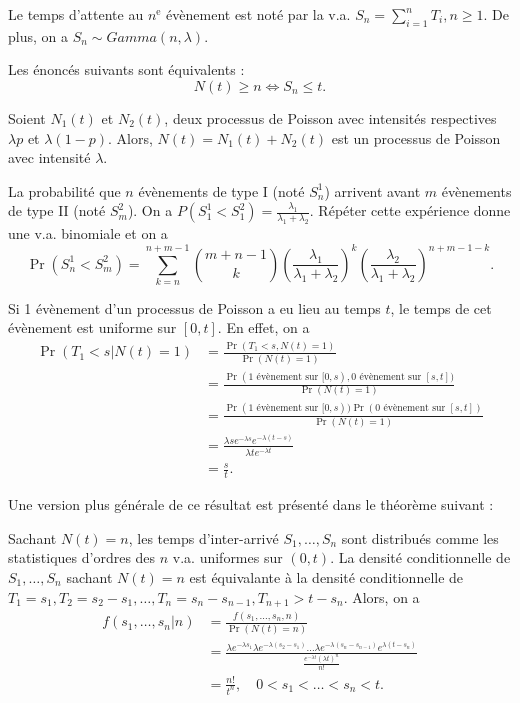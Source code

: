 \begin{definition}{}{}
	Le temps d'attente au $n^\text{e}$ évènement est noté par la v.a. $S_n = \sum_{i = 1}^{n}T_i, n\geq 1$. De plus, on a $S_n \sim Gamma(n, \lambda)$.
\end{definition}

Les énoncés suivants sont équivalents : 
$$N(t) \geq n \Leftrightarrow S_n \leq t.$$

\begin{propriete}{}{}
	Soient $N_1(t)$ et $N_2(t)$, deux processus de Poisson avec intensités respectives $\lambda p$ et $\lambda(1-p)$. Alors, $N(t) = N_1(t) + N_2(t)$ est un processus de Poisson avec intensité $\lambda$. 
\end{propriete}

La probabilité que $n$ évènements de type I (noté $S_n^1$) arrivent avant $m$ évènements de type II (noté $S_m^2$). On a $P(S_1^1 < S_1^2) = \frac{\lambda_1}{\lambda_1 + \lambda_2}$. Répéter cette expérience donne une v.a. binomiale et on a 
$$\Pr\left(S_n^1<S_m^2\right) = \sum_{k = n}^{n + m - 1} \binom{m + n - 1}{k} \left(\frac{\lambda_1}{\lambda_1 + \lambda_2}\right)^k \left(\frac{\lambda_2}{\lambda_1 + \lambda_2}\right)^{n+m-1-k}.$$

\begin{proposition}{}{}
	Si 1 évènement d'un processus de Poisson a eu lieu au temps $t$, le temps de cet évènement est uniforme sur $[0, t]$. En effet, on a 
	\begin{align*}
	\Pr(T_1 < s \vert N(t) = 1) &= \frac{\Pr(T_1 < s, N(t) = 1)}{\Pr(N(t) = 1)}\\
	&= \frac{\Pr(\text{1 évènement sur }[0, s), \text{0 évènement sur }[s, t])}{\Pr(N(t) = 1)}\\
	&= \frac{\Pr(\text{1 évènement sur }[0, s))\Pr(\text{0 évènement sur }[s, t])}{\Pr(N(t) = 1)}\\
	&= \frac{\lambda s e^{-\lambda s} e^{-\lambda(t-s)}}{\lambda t e^{-\lambda t}}\\
	&= \frac{s}{t}.
	\end{align*}
\end{proposition}

Une version plus générale de ce résultat est présenté dans le théorème suivant : 

\begin{theoreme}{}{}
	Sachant $N(t) = n$, les temps d'inter-arrivé $S_1, \dots, S_n$ sont distribués comme les statistiques d'ordres des $n$ v.a. uniformes sur $(0, t)$.
	\tcblower
	La densité conditionnelle de $S_1, \dots, S_n$ sachant $N(t) = n$ est équivalante à la densité conditionnelle de $T_1 = s_1, T_2 = s_2 - s_1, \dots, T_n = s_n - s_{n-1}, T_{n+1} > t - s_n$. Alors, on a 
	\begin{align*}
	f(s_1, \dots, s_n \vert n) &= \frac{f(s_1, \dots, s_n, n)}{\Pr(N(t) = n)}\\
	&= \frac{\lambda e^{-\lambda s_1} \lambda e^{-\lambda(s_2 - s_1)} \dots \lambda e^{-\lambda (s_n - s_{n-1})} e^{\lambda(t-s_n)}}{\frac{e^{-\lambda t}(\lambda t)^n}{n!}}\\
	&= \frac{n!}{t^n}, \quad 0<s_1<\dots <s_n<t.
	\end{align*}
\end{theoreme}

